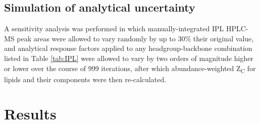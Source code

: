 \subsection{Simulation of analytical uncertainty} A sensitivity analysis was performed in which manually-integrated IPL HPLC-MS peak areas were allowed to vary randomly by up to 30\% their original value, and analytical response factors applied to any headgroup-backbone combination listed in Table \ref{tab:IPL} were allowed to vary by two orders of magnitude higher or lower over the course of 999 iterations, after which abundance-weighted Z\textsubscript{C} for lipids and their components were then re-calculated.


\section{Results}

